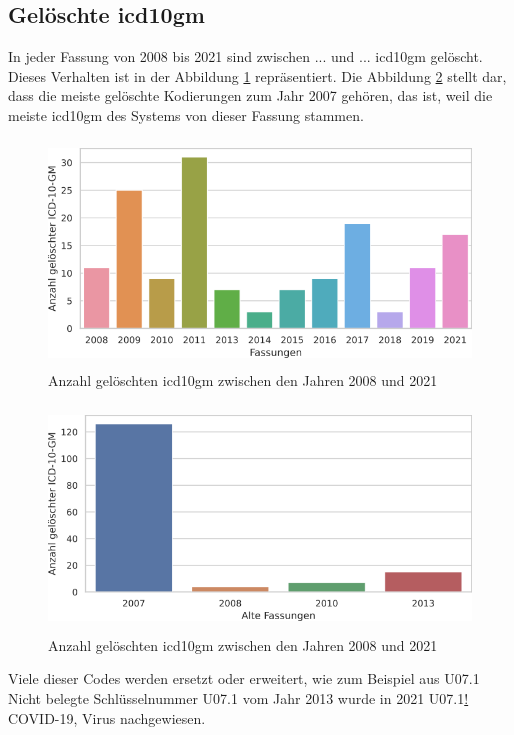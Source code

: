 \subsection{Gelöschte \acs{icd10gm}}

In jeder Fassung von 2008 bis 2021 sind zwischen ... und ... \ac{icd10gm} gelöscht. Dieses Verhalten ist in der Abbildung \ref{fig:newdeleteoldicdyear} repräsentiert. Die Abbildung \ref{fig:oldicdyear} stellt dar, dass die meiste gelöschte Kodierungen zum Jahr 2007 gehören, das ist, weil die meiste \ac{icd10gm} des Systems von dieser Fassung stammen.

\begin{figure}[ht]
	\centering
	\includegraphics[height=6cm]{figures/neuVersionDelete}
	\caption[Gelöschte \acs{icd10gm} pro Jahr]{Anzahl gelöschten \acs{icd10gm} zwischen den Jahren 2008 und 2021}
	\label{fig:newdeleteoldicdyear}
\end{figure} 

\begin{figure}[ht]
	\centering
	\includegraphics[height=6cm]{figures/oldVersionDelete}
	\caption[Gelöschte \acs{icd10gm} und deren alten Fassungen]{Anzahl gelöschten \acs{icd10gm} zwischen den Jahren 2008 und 2021}
	\label{fig:oldicdyear}
\end{figure} 

Viele dieser Codes werden ersetzt oder erweitert, wie zum Beispiel aus \textsf{U07.1} \textsf{Nicht belegte Schlüsselnummer U07.1} vom Jahr 2013 wurde in 2021 \textsf{U07.1\underline{!}} \textsf{COVID-19, Virus nachgewiesen}.

\newpage